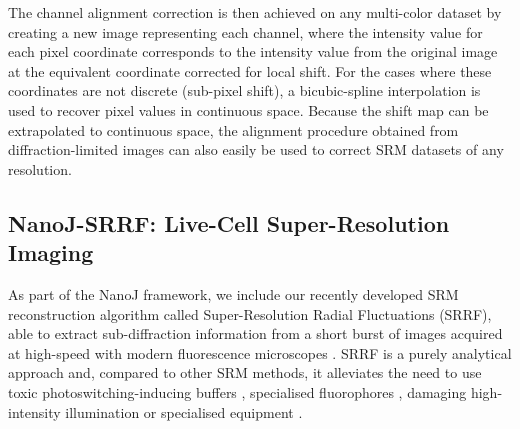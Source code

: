  The channel alignment correction is then achieved on any multi-color dataset by creating a new image representing each channel, where the intensity value for each pixel coordinate corresponds to the intensity value from the original image at the equivalent coordinate corrected for local shift. For the cases where these coordinates are not discrete (sub-pixel shift), a bicubic-spline interpolation is used to recover pixel values in continuous space. Because the shift map can be extrapolated to continuous space, the alignment procedure obtained from diffraction-limited images can also easily be used to correct SRM datasets of any resolution. 
 
\subsection*{NanoJ-SRRF: Live-Cell Super-Resolution Imaging}
 As part of the NanoJ framework, we include our recently developed SRM reconstruction algorithm called Super-Resolution Radial Fluctuations (SRRF), able to extract sub-diffraction information from a short burst of images acquired at high-speed with modern fluorescence microscopes \cite{gustafsson2016fast,culley2018srrf}. SRRF is a purely analytical approach and, compared to other SRM methods, it alleviates the need to use toxic photoswitching-inducing buffers \cite{henriques2011palm}, specialised fluorophores \cite{dempsey2011evaluation,henriques2009palm}, damaging high-intensity illumination \cite{waldchen2015light} or specialised equipment \cite{gustafsson2000surpassing,hell1994breaking}.
 
